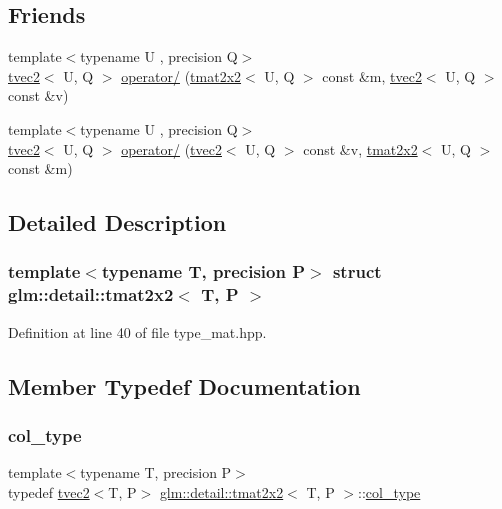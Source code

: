 \subsection*{Friends}
\begin{DoxyCompactItemize}
\item 
{\footnotesize template$<$typename U , precision Q$>$ }\\\hyperlink{structglm_1_1detail_1_1tvec2}{tvec2}$<$ U, Q $>$ \hyperlink{structglm_1_1detail_1_1tmat2x2_a6d8b6618f8e231cea3dec1d6b21d7de3}{operator/} (\hyperlink{structglm_1_1detail_1_1tmat2x2}{tmat2x2}$<$ U, Q $>$ const \&m, \hyperlink{structglm_1_1detail_1_1tvec2}{tvec2}$<$ U, Q $>$ const \&v)
\item 
{\footnotesize template$<$typename U , precision Q$>$ }\\\hyperlink{structglm_1_1detail_1_1tvec2}{tvec2}$<$ U, Q $>$ \hyperlink{structglm_1_1detail_1_1tmat2x2_af5138f235b2448c769a37e7d222a5ab6}{operator/} (\hyperlink{structglm_1_1detail_1_1tvec2}{tvec2}$<$ U, Q $>$ const \&v, \hyperlink{structglm_1_1detail_1_1tmat2x2}{tmat2x2}$<$ U, Q $>$ const \&m)
\end{DoxyCompactItemize}


\subsection{Detailed Description}
\subsubsection*{template$<$typename T, precision P$>$\newline
struct glm\+::detail\+::tmat2x2$<$ T, P $>$}



Definition at line 40 of file type\+\_\+mat.\+hpp.



\subsection{Member Typedef Documentation}
\mbox{\label{structglm_1_1detail_1_1tmat2x2_ae8c6de6197aa1b65adf15c40197c04d1}} 
\subsubsection{\texorpdfstring{col\+\_\+type}{col\_type}}
{\footnotesize\ttfamily template$<$typename T, precision P$>$ \\
typedef \hyperlink{structglm_1_1detail_1_1tvec2}{tvec2}$<$T, P$>$ \hyperlink{structglm_1_1detail_1_1tmat2x2}{glm\+::detail\+::tmat2x2}$<$ T, P $>$\+::\hyperlink{structglm_1_1detail_1_1tmat2x2_ae8c6de6197aa1b65adf15c40197c04d1}{col\+\_\+type}}



